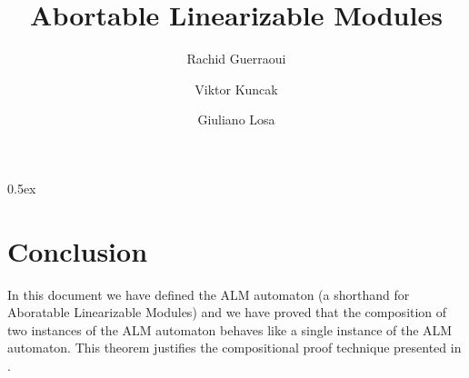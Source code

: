 \documentclass[11pt,a4paper]{article}
\begin{document}
\title{Abortable Linearizable Modules}
\author{Rachid Guerraoui \and Viktor Kuncak \and Giuliano Losa}
\maketitle



\tableofcontents


\parindent 0pt\parskip 0.5ex



\section{Conclusion}

In this document we have defined the ALM automaton (a shorthand for Aboratable Linearizable Modules)  and we have proved that the composition of two instances of the ALM automaton  behaves like a single instance of the ALM automaton. This theorem justifies the compositional proof technique presented in \cite{GKL2012SpeculativeLinearizability}.



\end{document}
